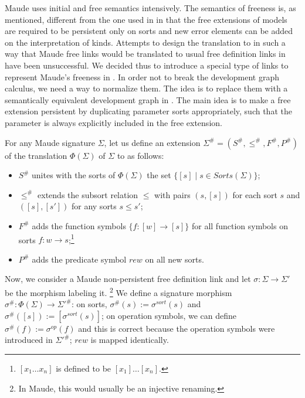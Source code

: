 Maude uses initial and free semantics intensively. The semantics of
freeness is, as mentioned, different from the one used in \CASL in
that the free extensions of models are required to be persistent
only on sorts and new error elements can be added on the
interpretation of kinds. Attempts to design the translation to \CASL
in such a way that Maude free links would be translated to usual free
definition links in \CASL have been unsuccessful. We decided thus to
introduce a special type of links to represent Maude's freeness in
\CASL.  In order not to break the development graph calculus, we need
a way to normalize them. The idea is to replace them with a
semantically equivalent development graph in \CASL. The main idea is
to make a free extension persistent by duplicating parameter sorts
appropriately, such that the parameter is always explicitly included
in the free extension.

For any Maude signature $\Sigma$, let us define
an extension $\Sigma^\# = (S^\#, \leq^\#, F^\#, P^\#)$ of the
translation $\Phi(\Sigma)$ of $\Sigma$ to \CASL as follows:

\begin{itemize}

 \item $S^\#$ unites with the sorts of $\Phi(\Sigma)$ the set 
       $\{[s] \mid s \in Sorts(\Sigma)\}$;

 \item $\leq^\#$ extends the subsort relation $\leq$ with pairs
       $(s, [s])$ for each sort $s$ and $([s],[s'])$ for any sorts $s \leq s'$;

 \item $F^\#$ adds the function symbols $\{f:[w] \rightarrow [s]\}$ for all
       function symbols on sorts $f:w \rightarrow s $;\footnote{$[x_1 \ldots x_n]$
       is defined to be $[x_1] \ldots [x_n]$.}
 \item $P^\#$ adds the predicate symbol $rew$ on all new sorts.
\end{itemize}

Now, we consider a Maude non-persistent free definition link and let
$\sigma: \Sigma \rightarrow \Sigma'$ be the morphism labeling it.%
\footnote{In Maude, this would usually be an injective renaming.}
We define a \CASL signature morphism 
 $\sigma^\# : \Phi(\Sigma) \rightarrow \Sigma'^\#$: on sorts, 
 $\sigma^\#(s) := \sigma^{sort}(s)$ and $\sigma^\#([s]):=[\sigma^{sort}(s)]$;
 on operation symbols, we can define $\sigma^ \#(f) := 
 \sigma^{op}(f)$ and this is correct because the operation symbols were
 introduced in $\Sigma'^\#$; $rew$ is mapped identically.


